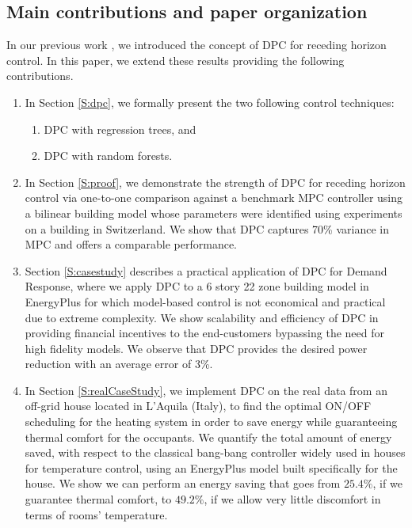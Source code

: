 \subsection{Main contributions and paper organization}
In our previous work \cite{Behl2016,Jain2016,JainACC2017,JainCDC2017}, we introduced the concept of DPC for receding horizon control. In this paper, we extend these results providing the following contributions.
\begin{enumerate}
	\item In Section \ref{S:dpc}, we formally present the two following control techniques:
	\begin{enumerate}
		\item DPC with regression trees, and
		\item DPC with random forests.
	\end{enumerate}
	\item In Section \ref{S:proof}, we demonstrate the strength of DPC for receding horizon control via one-to-one comparison against a benchmark MPC controller using a bilinear building model whose parameters were identified using experiments on a building in Switzerland. We show that DPC captures 70\% variance in MPC and offers a comparable performance.
	\item Section \ref{S:casestudy} describes a practical application of DPC for Demand Response, where we apply DPC to a 6 story 22 zone building model in EnergyPlus \cite{Crawley2001} for which model-based control is not economical and practical due to extreme complexity. We show scalability and efficiency of DPC in providing financial incentives to the end-customers bypassing the need for high fidelity models. We observe that DPC provides the desired power reduction with an average error of 3\%.
	\item In Section \ref{S:realCaseStudy}, we implement DPC on the real data from an off-grid house located in L'Aquila (Italy), to find the optimal ON/OFF scheduling for the heating system in order to save energy while guaranteeing thermal comfort for the occupants. We quantify the total amount of energy saved, with respect to the classical bang-bang controller widely used in houses for temperature control, using an EnergyPlus model built specifically for the house. We show we can perform an energy saving that goes from $25.4\%$, if we guarantee thermal comfort, to $49.2\%$, if we allow very little discomfort in terms of rooms' temperature.
\end{enumerate}

